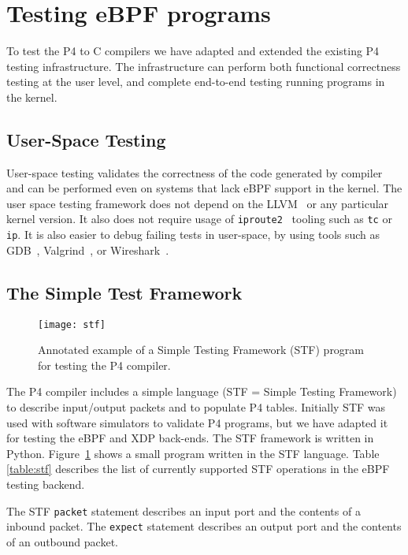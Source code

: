 \section{Testing eBPF programs}\label{sec:testing}

To test the P4 to C compilers we have adapted and extended the
existing P4 testing infrastructure.  The infrastructure can perform
both functional correctness testing at the user level, and complete
end-to-end testing running programs in the kernel.

\subsection{User-Space Testing}

User-space testing validates the correctness of the code generated by
compiler and can be performed even on systems that lack eBPF support
in the kernel.  The user space testing framework does not depend on
the LLVM~\cite{llvm} or any particular kernel version.  It also does
not require usage of \texttt{iproute2}~\cite{iproute} tooling such as
\texttt{tc} or \texttt{ip}.  It is also easier to debug failing tests
in user-space, by using tools such as GDB~\cite{gdb},
Valgrind~\cite{valgrind}, or Wireshark~\cite{wireshark}.


\subsection{The Simple Test Framework}
\begin{figure}[h]
  \centering
  \texttt{[image: stf]}
  \caption{Annotated example of a Simple Testing Framework (STF)
    program for testing the P4 compiler.}
  \label{fig:stf}
\end{figure}

The P4 compiler includes a simple language (STF = Simple Testing
Framework) to describe input/output packets and to populate P4 tables.
Initially STF was used with software simulators to validate P4
programs, but we have adapted it for testing the eBPF and XDP
back-ends.  The STF framework is written in Python.
Figure~\ref{fig:stf} shows a small program written in the STF
language.  Table \ref{table:stf} describes the list of currently
supported STF operations in the eBPF testing backend.

The STF \texttt{packet} statement describes an input port and the
contents of a inbound packet.  The \texttt{expect} statement describes
an output port and the contents of an outbound packet.

